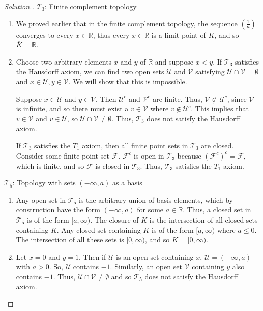 \documentclass{article}
\newcommand{\T}{\mathcal{T}}
\newcommand{\U}{\mathcal{U}}
\newcommand{\R}{\mathbb{R}}
\newcommand{\V}{\mathcal{V}}
\newcommand{\sk}{\smallskip}
\begin{document}
\begin{enumerate}
\begin{proof}[Solution.]
        \underline{$\T_3$: Finite complement topology}
        \begin{enumerate}
            \item We proved earlier that in the finite complement topology, the sequence $\left(\frac{1}{n}\right)$ converges to every $x \in \R$, thus every $x \in \R$ is a limit point of $K$, and so $\overline{K} = \R$. 
    
            \item Choose two arbitrary elements $x$ and $y$ of $\R$ and suppose $x < y$. If $\T_3$ satisfies the Hausdorff axiom, we can find two open sets $\U$ and $\V$ satisfying $\U \cap \V = \emptyset$ and $x \in \U, y \in \V$. We will show that this is impossible. 
    
            \sk
            
            Suppose $x \in \U$ and $y \in \V$. Then $\U^c$ and $\V^c$ are finite. Thus, $\V \not\subset \U^c$, since $\V$ is infinite, and so there must exist a $v \in \V$ where $v \notin \U^c$. This implies that $v \in \V$ and $v \in \U$, so $\U \cap \V \neq \emptyset$. Thus, $\T_3$ does not satisfy the Hausdorff axiom.
    
            \sk 
    
            If $\T_3$ satisfies the $T_1$ axiom, then all finite point sets in $\T_3$ are closed. Consider some finite point set $\mathcal{F}$. $\mathcal{F}^c$ is open in $\T_3$ because $(\mathcal{F}^c)^c = \mathcal{F}$, which is finite, and so $\mathcal{F}$ is closed in $\T_3$. Thus, $\T_3$ satisfies the $T_1$ axiom. 
        \end{enumerate}
    
        \underline{$\T_5$: Topology with sets $(-\infty, a)$ as a basis}
        \begin{enumerate}
            \item Any open set in $\T_5$ is the arbitrary union of basis elements, which by construction have the form $(-\infty, a)$ for some $a \in \R$. Thus, a closed set in $\T_5$ is of the form $[a, \infty)$. The closure of $K$ is the intersection of all closed sets containing $K$. Any closed set containing $K$ is of the form $[a, \infty)$ where $a \leq 0$. The intersection of all these sets is $[0, \infty)$, and so $\overline{K} = [0, \infty)$. 
            
            \item Let $x = 0$ and $y = 1$. Then if $\U$ is an open set containing $x$, $\U = (-\infty, a)$ with $a > 0$. So, $\U$ contains $-1$. Similarly, an open set $\V$ containing $y$ also contains $-1$. Thus, $\U \cap \V \neq \emptyset$ and so $\T_5$ does not satisfy the Hausdorff axiom. 
    

\end{enumerate}
\end{proof}
\end{enumerate}
\end{document}
